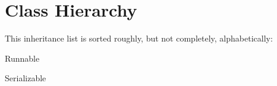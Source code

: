 \section{Class Hierarchy}
This inheritance list is sorted roughly, but not completely, alphabetically\+:\begin{DoxyCompactList}
\item {}
\item {}
\item Runnable\begin{DoxyCompactList}
\item {}
\item {}
\item {}
\end{DoxyCompactList}
\item Serializable\begin{DoxyCompactList}
\item {}
\item {}
\end{DoxyCompactList}
\end{DoxyCompactList}
